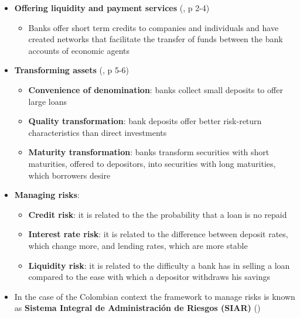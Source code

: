 \documentclass[
  ignorenonframetext,
]{beamer}
\providecommand{\tightlist}{%
  \setlength{\itemsep}{0pt}\setlength{\parskip}{0pt}}\usepackage{longtable,booktabs,array}
\begin{document}
\begin{frame}{}
\label{section-16}
\begin{itemize}
\item
  \textbf{Offering liquidity and payment services}
  (,
  p 2-4)

  \begin{itemize}
  \tightlist
  \item
    Banks offer short term credits to companies and individuals and have
    created networks that facilitate the transfer of funds between the
    bank accounts of economic agents
  \end{itemize}
\item
  \textbf{Transforming assets}
  (,
  p 5-6)

  \begin{itemize}
  \tightlist
  \item
    \textbf{Convenience of denomination}: banks collect small deposits
    to offer large loans
  \item
    \textbf{Quality transformation}: bank deposits offer better
    risk-return characteristics than direct investments
  \item
    \textbf{Maturity transformation}: banks transform securities with
    short maturities, offered to depositors, into securities with long
    maturities, which borrowers desire
  \end{itemize}
\end{itemize}
\end{frame}

\begin{frame}{}
\label{section-17}
\begin{itemize}
\item
  \textbf{Managing risks}:

  \begin{itemize}
  \tightlist
  \item
    \textbf{Credit risk}: it is related to the the probability that a
    loan is no repaid
  \item
    \textbf{Interest rate risk}: it is related to the difference between
    deposit rates, which change more, and lending rates, which are more
    stable
  \item
    \textbf{Liquidity risk}: it is related to the difficulty a bank has
    in selling a loan compared to the ease with which a depositor
    withdraws his savings
  \end{itemize}
\item
  In the case of the Colombian context the framework to manage risks is
  known as \textbf{Sistema Integral de Administración de Riesgos (SIAR)}
  ()
\end{itemize}
\end{frame}
\end{document}
